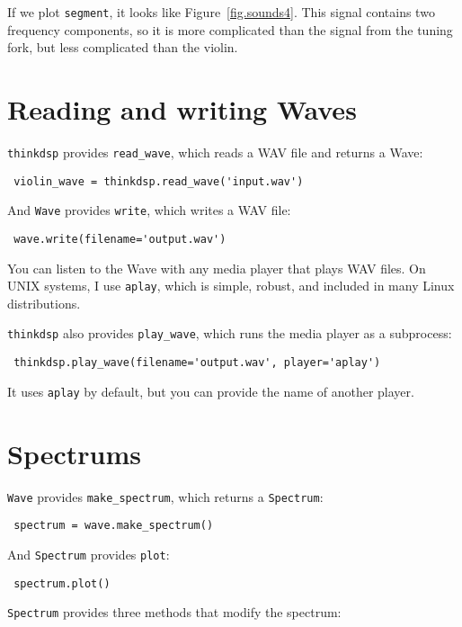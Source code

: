 \documentclass[12pt]{book} \usepackage[width=5.5in,height=8.5in, hmarginratio=3:2,vmarginratio=1:1]{geometry}
\begin{document}
If we plot {\tt segment}, it looks like Figure~\ref{fig.sounds4}. This signal contains two frequency components, so it is more complicated than the signal from the tuning fork, but less complicated than the violin. 

\section{Reading and writing Waves} 

{\tt thinkdsp} provides \verb"read_wave", which reads a WAV file and returns a Wave: 

\begin{verbatim} violin_wave = thinkdsp.read_wave('input.wav') \end{verbatim} 

And {\tt Wave} provides {\tt write}, which writes a WAV file: 

\begin{verbatim} wave.write(filename='output.wav') \end{verbatim} 

You can listen to the Wave with any media player that plays WAV files. On UNIX systems, I use {\tt aplay}, which is simple, robust, and included in many Linux distributions. 

{\tt thinkdsp} also provides \verb"play_wave", which runs the media player as a subprocess: 

\begin{verbatim} thinkdsp.play_wave(filename='output.wav', player='aplay') \end{verbatim} 

It uses {\tt aplay} by default, but you can provide the name of another player. 

\section{Spectrums} \label{spectrums} 

{\tt Wave} provides \verb"make_spectrum", which returns a {\tt Spectrum}: 

\begin{verbatim} spectrum = wave.make_spectrum() \end{verbatim} 

And {\tt Spectrum} provides {\tt plot}: 

\begin{verbatim} spectrum.plot() \end{verbatim} 

{\tt Spectrum} provides three methods that modify the spectrum: 
\end{document}
